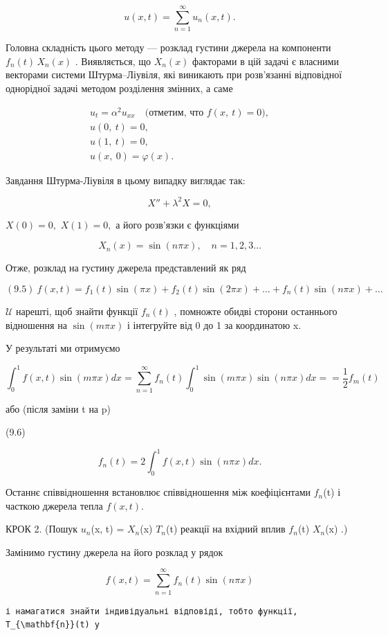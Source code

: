 \documentclass[
  ukrainian,
]{article}
\begin{document}
\[
u(x, t) = \sum_{n=1}^{\infty} u_n(x, t).
\]

Головна складність цього методу --- розклад густини джерела на
компоненти \(f_n(t)\,X_n(x)\) . Виявляється, що \(X_n(x)\) факторами в
цій задачі є власними векторами системи Штурма--Ліувіля, які виникають
при розв'язанні відповідної однорідної задачі методом розділення
змінних, а саме

\[
\begin{array}{c} u_t = \alpha^2 u_{xx} \quad \text{(отметим, что } f(x, \ t) = 0), \\ u(0, \ t) = 0, \\ u(1, \ t) = 0, \\ u(x, \ 0) = \varphi(x). \end{array}
\]

Завдання Штурма-Ліувіля в цьому випадку виглядає так:

\[
X'' + \lambda^2 X = 0,
\]

\(X(0) = 0,\) \(X(1) = 0,\) а його розв'язки є функціями

\[
X_n(x) = \sin(n\pi x), \quad n = 1, 2, 3 \dots
\]

Отже, розклад на густину джерела представлений як ряд

\[
(9.5) \ f(x,t) = f_1(t) \sin(\pi x) + f_2(t) \sin(2\pi x) + \dots + f_n(t) \sin(n\pi x) + \dots
\]

\(\mathcal{U}\) нарешті, щоб знайти функції \(f_n(t)\) , помножте обидві
сторони останнього відношення на \(\sin(m\pi x)\) і інтегруйте від 0 до
1 за координатою x.

У результаті ми отримуємо

\[
\int_{0}^{1} f(x, t) \sin(m\pi x) dx = \sum_{n=1}^{\infty} f_{n}(t) \int_{0}^{1} \sin(m\pi x) \sin(n\pi x) dx =
= \frac{1}{2} f_{m}(t)
\]

або (після заміни t на p)

(9.6)

\[
f_{n}(t) = 2 \int_{0}^{1} f(x, t) \sin(n\pi x) dx.
\]

Останнє співвідношення встановлює співвідношення між коефіцієнтами
\(f_n\)(t) і часткою джерела тепла \(f(x, t)\).

КРОК 2. (Пошук \(u_n\)(x, t) = \(X_n\)(x) \(T_n\)(t) реакції на вхідний
вплив \(f_n\)(t) \(X_n\)(x) .)

Замінимо густину джерела на його розклад у рядок

\[
f(x, t) = \sum_{n=1}^{\infty} f_n(t) \sin(n\pi x)
\]

\begin{verbatim}
і намагатися знайти індивідуальні відповіді, тобто функції, T_{\mathbf{n}}(t) у
\end{verbatim}
\end{document}
